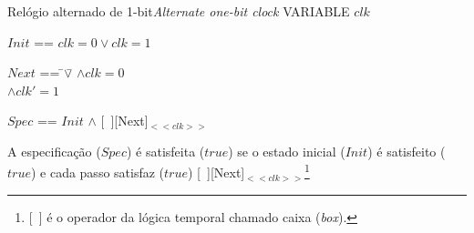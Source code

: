 \begin{frame}{Relógio alternado de 1-bit}{\em Alternate one-bit clock}
  VARIABLE $clk$  

  \pause

  \bigskip
   $Init$ == $clk = 0 \lor clk=1$ \\

  \pause
  \bigskip\begingroup

    \hfill
    \begin{tabbing}
      $Next$ == \=$\lor$\= $\land clk = 0$\\
      \>\>$\land clk' = 1$\\
    \end{tabbing}

\endgroup

\pause\bigskip

$Spec$ == $Init$ $\land$ [\ ][Next]$_{<<clk>>}$ 

\pause\medskip

{\scriptsize\color{blue} A especificação ($Spec$) é satisfeita ($true$) se o
  estado inicial ($Init$) é satisfeito ($true$) e cada passo satisfaz
  ($true$) [\ ][Next]$_{<<clk>>}$\footnote{\tiny [\ ] é o operador da lógica temporal
   chamado caixa ({\em box}).}}

\end{frame}

